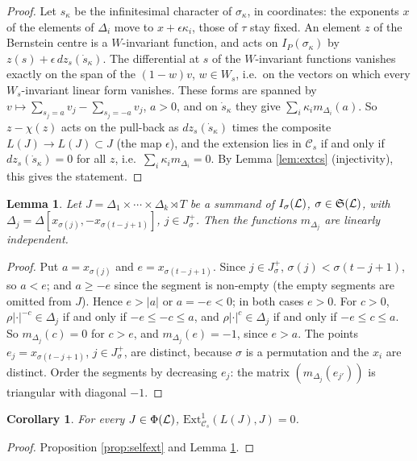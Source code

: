 \documentclass[a4paper,12pt,leqno]{amsart}
\theoremstyle{plain}
\newtheorem{lemma}[thm]{Lemma}
\newtheorem{cor}[thm]{Corollary}
\theoremstyle{definition}
\providecommand{\frS}{\mathfrak{S}}\providecommand{\frs}{\mathfrak{s}}
\begin{document}
\begin{proof}
Let $s_\kappa$ be the infinitesimal character of $\sigma_\kappa$, in coordinates: the exponents
$x$ of the elements of $\Delta_i$ move to $x+\epsilon\kappa_i$, those of $\tau$ stay fixed. An element $z$ of
the Bernstein centre is a $W$-invariant function, and acts on $I_P(\sigma_\kappa)$ by
$z(s)+\epsilon\, dz_s(\dot s_\kappa)$. The differential at $s$ of the $W$-invariant functions
vanishes exactly on the span of the $(1-w)v$, $w\in W_s$, i.e.\ on the vectors on which every
$W_s$-invariant linear form vanishes. These forms are spanned by
$v\mapsto\sum_{s_j=a}v_j-\sum_{s_j=-a}v_j$, $a>0$, and on $\dot s_\kappa$ they give
$\sum_i\kappa_im_{\Delta_i}(a)$. So $z-\chi(z)$ acts on the pull-back as $dz_s(\dot s_\kappa)$ times the composite
$L(J)\to L(J)\subset J$ (the map $\epsilon$), and the extension lies in $\mathcal{C}_s$ if and only if
$dz_s(\dot s_\kappa)=0$ for all $z$, i.e.\ $\sum_i\kappa_im_{\Delta_i}=0$. By Lemma \ref{lem:extcs} (injectivity), this gives the statement.
\end{proof}

\begin{lemma}\label{lem:mindep} Let $J=\Delta_1\times\cdots\times\Delta_k\rtimes T$ be a summand of
$I_\sigma(\mathcal{L})$, $\sigma\in\frS(\caL)$, with $\Delta_j=\Delta[x_{\sigma(j)},-x_{\sigma(t-j+1)}]$,
$j\in J^+_\sigma$. Then the functions $m_{\Delta_j}$ are linearly independent.
\end{lemma}

\begin{proof}
Put $a=x_{\sigma(j)}$ and $e=x_{\sigma(t-j+1)}$. Since $j\in J^+_\sigma$, $\sigma(j)<\sigma(t-j+1)$, so
$a<e$; and $a\geq-e$ since the segment is non-empty (the empty segments are omitted from $J$). Hence $e>|a|$ or $a=-e<0$; in both cases $e>0$.
For $c>0$, $\rho|\cdot|^{-c}\in\Delta_j$ if and only if $-e\leq -c\leq a$, and
$\rho|\cdot|^{c}\in\Delta_j$ if and only if $-e\leq c\leq a$. So $m_{\Delta_j}(c)=0$ for $c>e$, and
$m_{\Delta_j}(e)=-1$, since $e>a$. The points $e_j=x_{\sigma(t-j+1)}$, $j\in J^+_\sigma$, are distinct,
because $\sigma$ is a permutation and the $x_i$ are distinct. Order the segments by decreasing $e_j$:
the matrix $(m_{\Delta_j}(e_{j'}))$ is triangular with diagonal $-1$.
\end{proof}

\begin{cor}\label{cor:selfext} For every $J\in\Phi(\mathcal{L})$, $\mathrm{Ext}^1_{\mathcal{C}_s}(L(J),J)=0$.
\end{cor}

\begin{proof}
Proposition \ref{prop:selfext} and Lemma \ref{lem:mindep}.
\end{proof}
\end{document}

